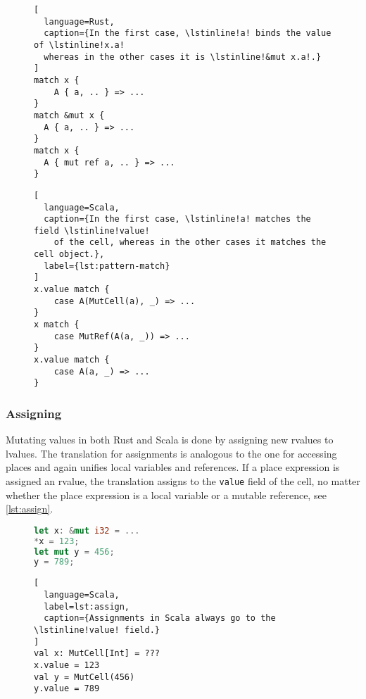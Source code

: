 \begin{figure}
\noindent\begin{minipage}[t]{.48\textwidth}
\begin{lstlisting}[
  language=Rust,
  caption={In the first case, \lstinline!a! binds the value of \lstinline!x.a!
  whereas in the other cases it is \lstinline!&mut x.a!.}
]
match x {
    A { a, .. } => ...
}
match &mut x {
  A { a, .. } => ...
}
match x {
  A { mut ref a, .. } => ...
}
\end{lstlisting}
\end{minipage}\hfill
\begin{minipage}[t]{.48\textwidth}
\begin{lstlisting}[
  language=Scala,
  caption={In the first case, \lstinline!a! matches the field \lstinline!value!
    of the cell, whereas in the other cases it matches the cell object.},
  label={lst:pattern-match}
]
x.value match {
    case A(MutCell(a), _) => ...
}
x match {
    case MutRef(A(a, _)) => ...
}
x.value match {
    case A(a, _) => ...
}
\end{lstlisting}
\end{minipage}
\end{figure}


\subsubsection{Assigning}

Mutating values in both Rust and Scala is done by assigning new rvalues to
lvalues. The translation for assignments is analogous to the one for accessing
places and again unifies local variables and references. If a place expression
is assigned an rvalue, the translation assigns to the
\passthrough{\lstinline!value!} field of the cell, no matter whether the place
expression is a local variable or a mutable reference, see \autoref{lst:assign}.

\begin{figure}
\noindent\begin{minipage}[t]{.48\textwidth}
\begin{lstlisting}[language=Rust, caption={Dereferencing and assigning in Rust.}]
let x: &mut i32 = ...
*x = 123;
let mut y = 456;
y = 789;
\end{lstlisting}
\end{minipage}\hfill
\begin{minipage}[t]{.48\textwidth}
\begin{lstlisting}[
  language=Scala,
  label=lst:assign,
  caption={Assignments in Scala always go to the \lstinline!value! field.}
]
val x: MutCell[Int] = ???
x.value = 123
val y = MutCell(456)
y.value = 789
\end{lstlisting}
\end{minipage}
\end{figure}

